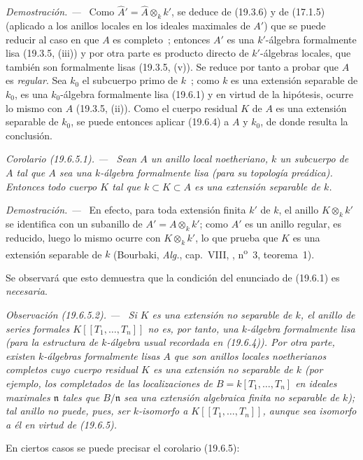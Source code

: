 \documentclass[10pt,oneside]{book}
\makeatletter
\newcommand{\setmanualcurrentlabel}[1]{\def\@currentlabel{#1}}
\newcommand{\oldpage}[2][]{%
  \setcounter{footnote}{0}%
  \marginpar{\scriptsize\textbf{#1}~|~#2}\ignorespaces}
\newenvironment{corollary}[1][]{%
  \setmanualcurrentlabel{#1}\par\medskip\noindent\itshape Corolario (#1). ---\ }{\par}
\newenvironment{remark}[1][]{%
  \setmanualcurrentlabel{#1}\par\medskip\noindent\itshape Observación (#1). ---\ }{\par}
\newenvironment{proof}{%
  \par\medskip\noindent\textit{Demostración. ---\ }}{\par}
\makeatother
\begin{document}
\begin{proof}
Como $\widehat A'=\widehat A\otimes_k k'$, se deduce de (19.3.6) y de
(17.1.5) (aplicado a los anillos locales en los ideales maximales de $A'$) que se
puede reducir al caso en que $A$ es completo~; entonces $A'$ es una $k'$-álgebra
formalmente lisa (19.3.5, (iii)) y por otra parte es producto directo de
$k'$-álgebras locales, que también son formalmente lisas (19.3.5, (v)). Se
reduce por tanto a probar que $A$ es \emph{regular}. Sea $k_0$ el subcuerpo
primo de $k$~; como $k$ es una extensión separable de $k_0$, es una
$k_0$-álgebra formalmente lisa (19.6.1) y en virtud de la hipótesis, ocurre lo
mismo con $A$ (19.3.5, (ii)). Como el cuerpo residual $K$ de $A$ es una
extensión separable de $k_0$, se puede entonces aplicar (19.6.4) a $A$ y $k_0$,
de donde resulta la conclusión.
\end{proof}

\oldpage[0\textsubscript{IV-1}]{103}
 
\begin{corollary}[19.6.5.1]
\label{0.19.6.5.1-es}
Sean $A$ un anillo local noetheriano, $k$ un subcuerpo de $A$ tal que $A$
sea una $k$-álgebra formalmente lisa (para su topología preádica). Entonces
todo cuerpo $K$ tal que $k\subset K\subset A$ es una extensión separable de
$k$.
\end{corollary}

\begin{proof}
En efecto, para toda extensión finita $k'$ de $k$, el anillo $K\otimes_k k'$
se identifica con un subanillo de $A'=A\otimes_k k'$; como $A'$ es un anillo
regular, es reducido, luego lo mismo ocurre con $K\otimes_k k'$, lo que prueba que $K$
es una extensión separable de $k$ (Bourbaki, \emph{Alg.}, cap.~VIII,
, n\textsuperscript{o}~3, teorema~1).
\end{proof}

Se observará que esto demuestra que la condición del enunciado de (19.6.1) es
\emph{necesaria}.

\begin{remark}[19.6.5.2]
\label{0.19.6.5.2-es}
Si $K$ es una extensión \emph{no separable} de $k$, el anillo de series
formales $K[[T_1,\ldots,T_n]]$ \emph{no es, por tanto}, una $k$-álgebra
formalmente lisa (para la estructura de $k$-álgebra usual recordada en
(19.6.4)). Por otra parte, existen $k$-álgebras formalmente lisas $A$ que
son anillos locales noetherianos completos cuyo cuerpo residual $K$ es una
extensión \emph{no separable} de $k$ (por ejemplo, los completados de las
localizaciones de $B=k[T_1,\ldots,T_n]$ en ideales maximales $\mathfrak n$ tales
que $B/\mathfrak n$ sea una extensión algebraica finita no separable de $k$);
tal anillo no puede, pues, ser \emph{$k$-isomorfo} a $K[[T_1,\ldots,T_n]]$, aunque
sea \emph{isomorfo} a él en virtud de (19.6.5).

En ciertos casos se puede precisar el corolario (19.6.5):
\end{remark}
\end{document}
